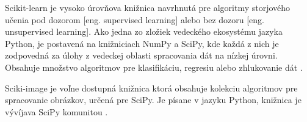 Scikit-learn je vysoko úrovňova knižnica navrhnutá pre algoritmy storjového učenia pod dozorom [eng. supervised learning] alebo bez dozoru [eng. unsupervised learning].
Ako jedna zo zložiek vedeckého ekosystému jazyka Python, je postavená na knižniciach NumPy a SciPy, kde každá z nich je zodpovedná za úlohy z vedeckej oblasti spracovania dát na nízkej úrovni.
Obsahuje množstvo algoritmov pre klasifikáciu, regresiu alebo zhlukovanie dát \cite{odkaz:FrameworkComparison3}.

Sciki-image je voľne dostupná knižnica ktorá obsahuje kolekciu algoritmov pre spracovanie obrázkov, určená pre SciPy.
Je písane v jazyku Python, knižnica je vývíjava SciPy komunitou \cite{prop:scikit-image}.
